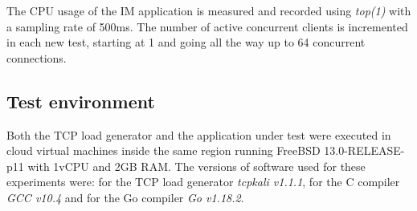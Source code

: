 The CPU usage of the IM application is measured and recorded using \textit{top(1)} with a sampling rate of 500ms. The number of active concurrent clients is incremented in each new test, starting at 1 and going all the way up to 64 concurrent connections.

\subsection{Test environment}
Both the TCP load generator and the application under test were executed in cloud virtual machines inside the same region running FreeBSD 13.0-RELEASE-p11 with 1vCPU and 2GB RAM. The versions of software used for these experiments were: for the TCP load generator \textit{tcpkali v1.1.1}, for the C compiler \textit{GCC v10.4} and for the Go compiler \textit{Go v1.18.2}.

